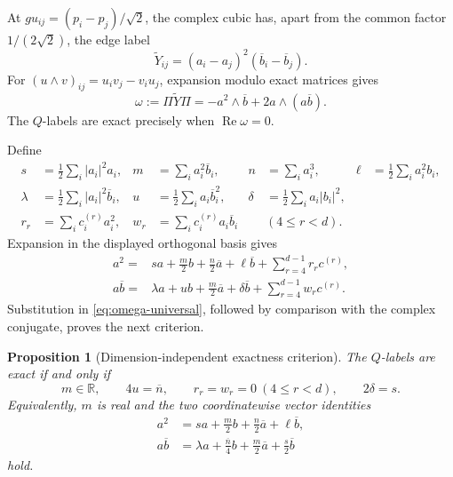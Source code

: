 \documentclass[11pt,reqno]{amsart}
\newtheorem{proposition}[theorem]{Proposition}
\theoremstyle{remark}
\newcommand{\R}{\mathbb R}
\newcommand{\abs}[1]{\left\lvert #1\right\rvert}
\begin{document}
At $gu_{ij}=(p_i-p_j)/\sqrt2$, the complex cubic has, apart from the common
factor $1/(2\sqrt2)$, the edge label
\[
 \widetilde Y_{ij}=(a_i-a_j)^2(\overline b_i-\overline b_j).
\]
For $(u\wedge v)_{ij}=u_iv_j-v_iu_j$, expansion modulo exact matrices gives
\begin{equation}\label{eq:omega-universal}
 \omega:=\Pi\widetilde Y\Pi
 =-a^2\wedge\overline b+2a\wedge(a\overline b).
\end{equation}
The $Q$-labels are exact precisely when $\operatorname{Re}\omega=0$.

Define
\begin{align*}
 s&=\frac12\sum_i\abs{a_i}^2a_i,&
 m&=\sum_i a_i^2\overline b_i,&
 n&=\sum_i a_i^3,&
 \ell&=\frac12\sum_i a_i^2b_i,\\
 \lambda&=\frac12\sum_i\abs{a_i}^2\overline b_i,&
 u&=\frac12\sum_i a_i\overline b_i^{2},&
 \delta&=\frac12\sum_i a_i\abs{b_i}^2,\\
 r_r&=\sum_i c_i^{(r)}a_i^2,&
 w_r&=\sum_i c_i^{(r)}a_i\overline b_i
 &&(4\le r<d).
\end{align*}
Expansion in the displayed orthogonal basis gives
\begin{align}
 a^2={}&sa+\frac m2b+\frac n2\overline a+\ell\overline b
       +\sum_{r=4}^{d-1}r_r c^{(r)},\label{eq:a2-full}\\
 a\overline b={}&\lambda a+ub+\frac m2\overline a+\delta\overline b
       +\sum_{r=4}^{d-1}w_r c^{(r)}.\label{eq:ab-full}
\end{align}
Substitution in \eqref{eq:omega-universal}, followed by comparison with the
complex conjugate, proves the next criterion.

\begin{proposition}[Dimension-independent exactness criterion]
\label{prop:universal-exactness}
The $Q$-labels are exact if and only if
\begin{equation}\label{eq:exactness-moments}
 m\in\R,\qquad 4u=\overline n,\qquad
 r_r=w_r=0\ (4\le r<d),\qquad 2\delta=s.
\end{equation}
Equivalently, $m$ is real and the two coordinatewise vector identities
\begin{align}
 a^2&=sa+\frac m2b+\frac n2\overline a+\ell\overline b,
 \label{eq:universal-a2}\\
 a\overline b&=\lambda a+\frac{\overline n}{4}b
 +\frac m2\overline a+\frac s2\overline b
 \label{eq:universal-ab}
\end{align}
hold.
\end{proposition}
\end{document}
